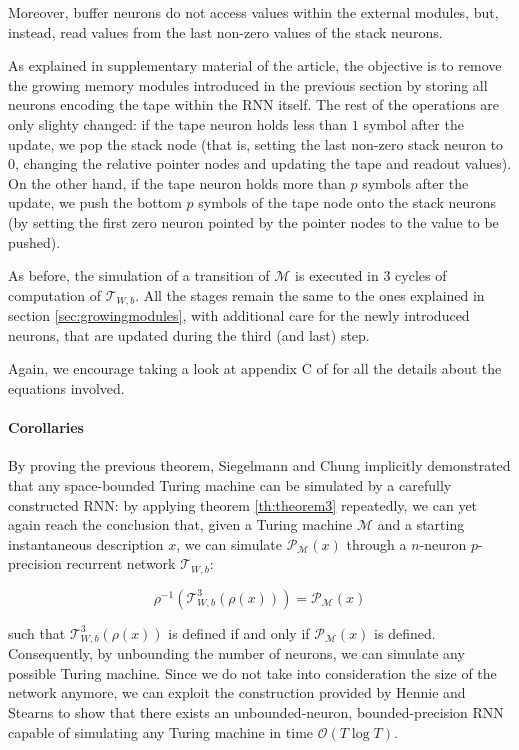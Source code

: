 \documentclass{article}
\begin{document}
Moreover, buffer neurons do not access values within the external modules, but, instead, read values from the last non-zero values of the stack neurons.

As explained in supplementary material of the article, the objective is to remove the growing memory modules introduced in the previous section by storing all neurons encoding the tape within the RNN itself. The rest of the operations are only slighty changed: if the tape neuron holds less than $1$ symbol after the update, we pop the stack node (that is, setting the last non-zero stack neuron to 0, changing the relative pointer nodes and updating the tape and readout values). On the other hand, if the tape neuron holds more than $p$ symbols after the update, we push the bottom $p$ symbols of the tape node onto the stack neurons (by setting the first zero neuron pointed by the pointer nodes to the value to be pushed).

As before, the simulation of a transition of $\mathcal{M}$ is executed in 3 cycles of computation of $\mathcal{T}_{W,b}$. All the stages remain the same to the ones explained in section \ref{sec:growingmodules}, with additional care for the newly introduced neurons, that are updated during the third (and last) step.

Again, we encourage taking a look at appendix C of \cite{CHU21} for all the details about the equations involved.

\paragraph{Corollaries}
By proving the previous theorem, Siegelmann and Chung implicitly demonstrated that any space-bounded Turing machine can be simulated by a carefully constructed RNN: by applying theorem \ref{th:theorem3} repeatedly, we can yet again reach the conclusion that, given a Turing machine $\mathcal{M}$ and a starting instantaneous description $x$, we can simulate $\mathcal{P}_{\mathcal{M}}(x)$ through a $n$-neuron $p$-precision recurrent network $\mathcal{T}_{W,b}$:

$$\rho^{-1}(\mathcal{T}^3_{W,b}(\rho(x))) = \mathcal{P}_{\mathcal{M}}(x)$$

such that $\mathcal{T}^3_{W,b}(\rho(x))$ is defined if and only if $\mathcal{P}_{\mathcal{M}}(x)$ is defined.
Consequently, by unbounding the number of neurons, we can simulate any possible Turing machine. Since we do not take into consideration the size of the network anymore, we can exploit the construction provided by Hennie and Stearns \cite{HEN66} to show that there exists an unbounded-neuron, bounded-precision RNN capable of simulating any Turing machine in time $\mathcal{O}(T \log T)$.
\end{document}

